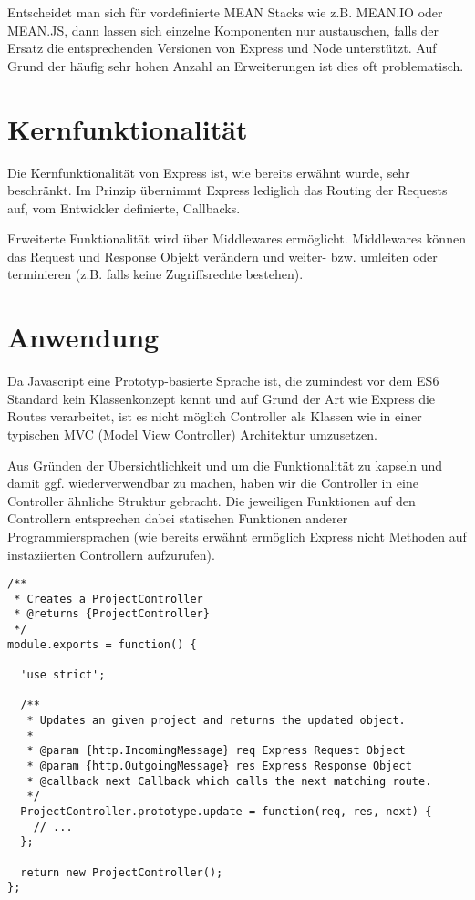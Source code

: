 Entscheidet man sich für vordefinierte MEAN Stacks wie z.B. MEAN.IO oder
MEAN.JS, dann lassen sich einzelne Komponenten nur austauschen, falls
der Ersatz die entsprechenden Versionen von Express und Node
unterstützt. Auf Grund der häufig sehr hohen Anzahl an Erweiterungen ist
dies oft problematisch.

\section{Kernfunktionalität}\label{kernfunktionalituxe4t}

Die Kernfunktionalität von Express ist, wie bereits erwähnt wurde, sehr
beschränkt. Im Prinzip übernimmt Express lediglich das Routing der
Requests auf, vom Entwickler definierte, Callbacks.

Erweiterte Funktionalität wird über Middlewares ermöglicht. Middlewares
können das Request und Response Objekt verändern und weiter- bzw.
umleiten oder terminieren (z.B. falls keine Zugriffsrechte bestehen).

\section{Anwendung}\label{anwendung}

Da Javascript eine Prototyp-basierte Sprache ist, die zumindest vor dem
ES6 Standard kein Klassenkonzept kennt und auf Grund der Art wie Express
die Routes verarbeitet, ist es nicht möglich Controller als Klassen wie
in einer typischen MVC (Model View Controller) Architektur umzusetzen.

Aus Gründen der Übersichtlichkeit und um die Funktionalität zu kapseln
und damit ggf. wiederverwendbar zu machen, haben wir die Controller in
eine Controller ähnliche Struktur gebracht. Die jeweiligen Funktionen
auf den Controllern entsprechen dabei statischen Funktionen anderer
Programmiersprachen (wie bereits erwähnt ermöglich Express nicht
Methoden auf instaziierten Controllern aufzurufen).

\begin{verbatim}
/**
 * Creates a ProjectController
 * @returns {ProjectController}
 */
module.exports = function() {

  'use strict';

  /**
   * Updates an given project and returns the updated object.
   *
   * @param {http.IncomingMessage} req Express Request Object
   * @param {http.OutgoingMessage} res Express Response Object
   * @callback next Callback which calls the next matching route.
   */
  ProjectController.prototype.update = function(req, res, next) {
    // ...
  };

  return new ProjectController();
};
\end{verbatim}
\lstset{basicstyle=\footnotesize\ttfamily, language=JavaScript, showspaces=false }
